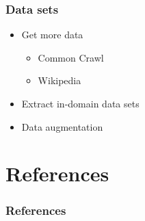 \documentclass{beamer}
\begin{document}
\begin{frame}
    \frametitle{Data sets}
    \begin{itemize}
        \item Get more data
        \begin{itemize}
            \item Common Crawl
            \item Wikipedia
        \end{itemize}
    \item Extract in-domain data sets \cite{selection_indomain}
    \item Data augmentation
    \end{itemize}
\end{frame}


\section{References}
\begin{frame}[allowframebreaks,t]
    \tiny
    \frametitle{References}
    
    
\end{frame}
\end{document}

